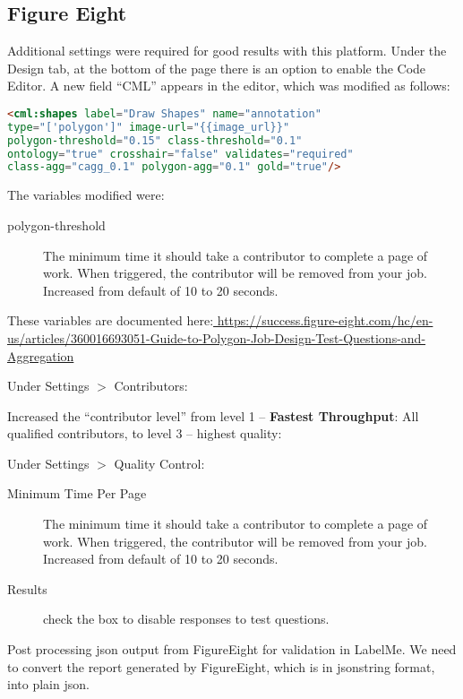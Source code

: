 \documentclass[11pt]{article} %
\begin{document}
\subsection{Figure Eight}

Additional settings were required for good results with this platform. 
Under the Design tab, at the bottom of the page there is an option to enable 
the Code Editor. A new field ``CML'' appears in the editor, which was modified 
as follows:

\begin{lstlisting}[language=html, frame=single]
<cml:shapes label="Draw Shapes" name="annotation" 
type="['polygon']" image-url="{{image_url}}" 
polygon-threshold="0.15" class-threshold="0.1" 
ontology="true" crosshair="false" validates="required" 
class-agg="cagg_0.1" polygon-agg="0.1" gold="true"/>
\end{lstlisting}

The variables modified were: 

\begin{description}
\item[polygon-threshold] The minimum time it should take a contributor to
complete a page of work. When triggered, the contributor will be removed from
your job. Increased from default of 10 to 20 seconds.
\end{description}

These variables are documented here:\url{ 
https://success.figure-eight.com/hc/en-us/articles/360016693051-Guide-to-Polygon-Job-Design-Test-Questions-and-Aggregation}

Under Settings $>$ Contributors:

Increased the ``contributor level'' from level 1 -- \textbf{Fastest
Throughput}: All qualified contributors, to level 3 -- highest quality: 

Under Settings $>$ Quality Control:

\begin{description}
\item[Minimum Time Per Page] The minimum time it should take a contributor to
complete a page of work. When triggered, the contributor will be removed from
your job. Increased from default of 10 to 20 seconds.

\item[Results] check the box to disable responses to test questions.
\end{description}

Post processing json output from FigureEight for validation in LabelMe. We need 
to convert the report generated by FigureEight, which is in jsonstring format, 
into plain json. 
\end{document}
